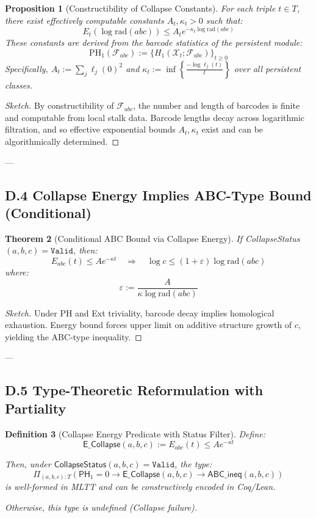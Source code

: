 \documentclass[11pt]{article}
\newtheorem{theorem}{Theorem}[section]
\newtheorem{definition}[theorem]{Definition}
\newtheorem{proposition}[theorem]{Proposition}
\begin{document}
\begin{proposition}[Constructibility of Collapse Constants]
For each triple \( t \in T \), there exist effectively computable constants \( A_t, \kappa_t > 0 \) such that:
\[
E_t(\log \mathrm{rad}(abc)) \leq A_t e^{-\kappa_t \log \mathrm{rad}(abc)}
\]
These constants are derived from the barcode statistics of the persistent module:
\[
\mathrm{PH}_1(\mathcal{F}_{abc}) := \{ H_1(\mathcal{X}_t; \mathcal{F}_{abc}) \}_{t \geq 0}
\]
Specifically, \( A_t := \sum_j \ell_j(0)^2 \) and \( \kappa_t := \inf\left\{ \frac{-\log \ell_j(t)}{t} \right\} \) over all persistent classes.
\end{proposition}

\begin{proof}[Sketch]
By constructibility of \( \mathcal{F}_{abc} \), the number and length of barcodes is finite and computable from local stalk data.  
Barcode lengths decay across logarithmic filtration, and so effective exponential bounds \( A_t, \kappa_t \) exist and can be algorithmically determined.
\end{proof}


---

\subsection*{D.4 Collapse Energy Implies ABC-Type Bound (Conditional)}

\begin{theorem}[Conditional ABC Bound via Collapse Energy]
If CollapseStatus\( (a,b,c) = \texttt{Valid} \), then:
\[
E_{abc}(t) \leq A e^{-\kappa t} \quad \Rightarrow \quad \log c \leq (1 + \varepsilon) \log \mathrm{rad}(abc)
\]
where:
\[
\varepsilon := \frac{A}{\kappa \log \mathrm{rad}(abc)}
\]
\end{theorem}

\begin{proof}[Sketch]
Under PH and Ext triviality, barcode decay implies homological exhaustion.  
Energy bound forces upper limit on additive structure growth of \( c \), yielding the ABC-type inequality.
\end{proof}

---

\subsection*{D.5 Type-Theoretic Reformulation with Partiality}

\begin{definition}[Collapse Energy Predicate with Status Filter]
Define:
\[
\mathsf{E\_Collapse}(a,b,c) := E_{abc}(t) \leq A e^{-\kappa t}
\]

Then, under \( \mathsf{CollapseStatus}(a,b,c) = \texttt{Valid} \), the type:
\[
\Pi_{(a,b,c):T} \left(
  \mathsf{PH}_1 = 0 \to \mathsf{E\_Collapse}(a,b,c) \to \mathsf{ABC\_ineq}(a,b,c)
\right)
\]
is well-formed in MLTT and can be constructively encoded in Coq/Lean.

Otherwise, this type is undefined (Collapse failure).
\end{definition}
\end{document}
